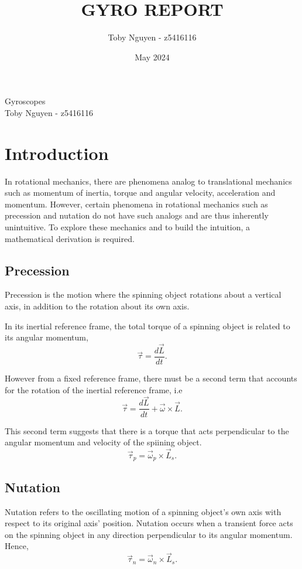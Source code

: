 \documentclass{article}
\title{GYRO REPORT}
\author{Toby Nguyen - z5416116}
\date{May 2024}
\begin{document}
\begin{center}
    \huge{Gyroscopes} \\[10pt]
    \large{Toby Nguyen - z5416116}
\end{center}
\tableofcontents
\newpage

\section{Introduction}
In rotational mechanics, there are phenomena analog to translational mechanics
such as momentum of inertia, torque and angular velocity, acceleration and
momentum. However, certain phenomena in rotational mechanics such as precession
and nutation do not have such analogs and are thus inherently unintuitive. To 
explore these mechanics and to build the intuition, a mathematical derivation is required. 

\subsection{Precession}
Precession is the motion where the spinning object rotations about a vertical axis, 
in addition to the rotation about its own axis.

In its inertial reference frame, the total torque of a spinning object is related to its angular momentum,
\begin{equation}
    \vec{\tau} = \frac{d\vec{L}}{dt}.
\end{equation}

However from a fixed reference frame, there must be a second term that accounts 
for the rotation of the inertial reference frame, i.e
\begin{equation}
    \vec{\tau} = \frac{d\vec{L}}{dt} + \vec{\omega} \times \vec{L}.
\end{equation}

This second term suggests that there is a torque that acts perpendicular to
the angular momentum and velocity of the spiining object. 
\begin{equation}
    \vec{\tau}_p = \vec{\omega}_p \times \vec{L}_s.
\end{equation}

\subsection{Nutation}
Nutation refers to the oscillating motion of a spinning object's own axis with respect
to its original axis' position. Nutation occurs when a transient force acts on the 
spinning object in any direction perpendicular to its angular momentum. Hence,
\begin{equation}
    \vec{\tau}_n = \vec{\omega}_n \times \vec{L}_s.
\end{equation}
\end{document}
